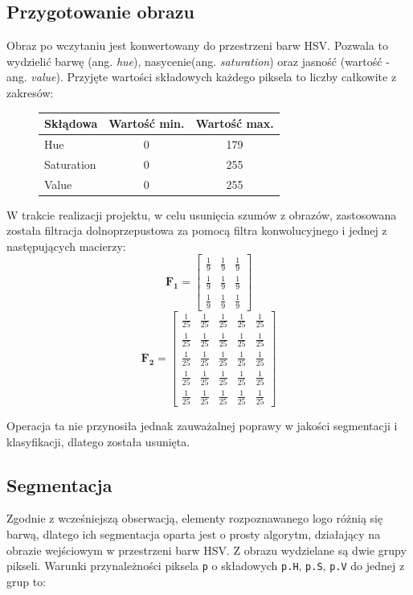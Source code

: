 \documentclass[12pt, oneside, final]{report}
\begin{document}
\subsection*{Przygotowanie obrazu}
Obraz po wczytaniu jest konwertowany do przestrzeni barw HSV. Pozwala to wydzielić barwę (ang. \textit{hue}), nasycenie(ang. \textit{saturation}) oraz jasność (wartość - ang. \textit{value}). Przyjęte wartości składowych każdego piksela to liczby całkowite z zakresów:
\begin{figure}[ht!]
	\centering
	\begin{tabular}{|l|c|c|}
		\hline
		Skłądowa & Wartość min. & Wartość max.\\
		\hline
		Hue & 0 & 179\\
		Saturation & 0 & 255\\
		Value & 0 & 255\\
		\hline
	\end{tabular}
\end{figure}

W trakcie realizacji projektu, w celu usunięcia szumów z obrazów, zastosowana została filtracja dolnoprzepustowa za pomocą filtra konwolucyjnego i jednej z następujących macierzy:
$$ 
\mathbf{F_1} = 
\left[\begin{matrix}
\frac{1}{9} & \frac{1}{9} & \frac{1}{9}\\
\frac{1}{9} & \frac{1}{9} & \frac{1}{9}\\
\frac{1}{9} & \frac{1}{9} & \frac{1}{9}
\end{matrix}\right]
$$
$$
\mathbf{F_2} = 
\left[\begin{matrix}
\frac{1}{25} & \frac{1}{25} & \frac{1}{25} & \frac{1}{25} & \frac{1}{25}\\
\frac{1}{25} & \frac{1}{25} & \frac{1}{25} & \frac{1}{25} & \frac{1}{25}\\
\frac{1}{25} & \frac{1}{25} & \frac{1}{25} & \frac{1}{25} & \frac{1}{25}\\
\frac{1}{25} & \frac{1}{25} & \frac{1}{25} & \frac{1}{25} & \frac{1}{25}\\
\frac{1}{25} & \frac{1}{25} & \frac{1}{25} & \frac{1}{25} & \frac{1}{25}
\end{matrix}\right]
$$

Operacja ta nie przynosiła jednak zauważalnej poprawy w jakości segmentacji i klasyfikacji, dlatego została usunięta.

\subsection*{Segmentacja}
Zgodnie z wcześniejszą obserwacją, elementy rozpoznawanego logo różnią się barwą, dlatego ich segmentacja oparta jest o prosty algorytm, działający na obrazie wejściowym w przestrzeni barw HSV. Z obrazu wydzielane są dwie grupy pikseli. Warunki przynależności piksela \texttt{p} o składowych \texttt{p.H}, \texttt{p.S}, \texttt{p.V} do jednej z grup to:
\end{document}
